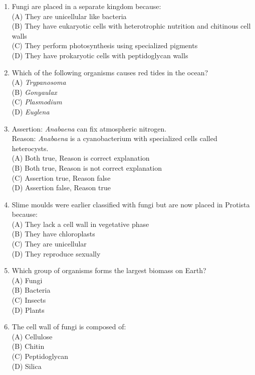 \documentclass{article}
\begin{document}
\begin{enumerate}[label=Q\arabic*.]
\item Fungi are placed in a separate kingdom because:
\\(A) They are unicellular like bacteria
\\(B) They have eukaryotic cells with heterotrophic nutrition and chitinous cell walls
\\(C) They perform photosynthesis using specialized pigments
\\(D) They have prokaryotic cells with peptidoglycan walls

\item Which of the following organisms causes red tides in the ocean?
\\(A) \textit{Trypanosoma}
\\(B) \textit{Gonyaulax}
\\(C) \textit{Plasmodium}
\\(D) \textit{Euglena}

\item Assertion: \textit{Anabaena} can fix atmospheric nitrogen.\\
Reason: \textit{Anabaena} is a cyanobacterium with specialized cells called heterocysts.
\\(A) Both true, Reason is correct explanation
\\(B) Both true, Reason is not correct explanation
\\(C) Assertion true, Reason false
\\(D) Assertion false, Reason true

\item Slime moulds were earlier classified with fungi but are now placed in Protista because:
\\(A) They lack a cell wall in vegetative phase
\\(B) They have chloroplasts
\\(C) They are unicellular
\\(D) They reproduce sexually

\item Which group of organisms forms the largest biomass on Earth?
\\(A) Fungi
\\(B) Bacteria
\\(C) Insects
\\(D) Plants

\item The cell wall of fungi is composed of:
\\(A) Cellulose
\\(B) Chitin
\\(C) Peptidoglycan
\\(D) Silica


\end{enumerate}
\end{document}
